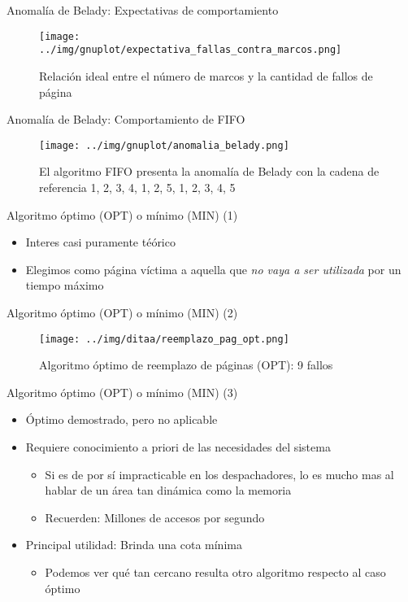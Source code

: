 \documentclass[presentation]{beamer}
\begin{document}
\begin{frame}[label={sec:org3654b76}]{Anomalía de Belady: Expectativas de comportamiento}
\begin{figure}[htbp]
\centering
\texttt{[image: ../img/gnuplot/expectativa\_fallas\_contra\_marcos.png]}
\caption{Relación ideal entre el número de marcos y la cantidad de fallos de página}
\end{figure}
\end{frame}

\begin{frame}[label={sec:orgcaeda9b}]{Anomalía de Belady: Comportamiento de FIFO}
\begin{figure}[htbp]
\centering
\texttt{[image: ../img/gnuplot/anomalia\_belady.png]}
\caption{El algoritmo FIFO presenta la anomalía de Belady con la cadena de referencia 1, 2, 3, 4, 1, 2, 5, 1, 2, 3, 4, 5}
\end{figure}
\end{frame}

\begin{frame}[label={sec:org7b289bb}]{Algoritmo óptimo (OPT) o mínimo (MIN) (1)}
\begin{itemize}
\item Interes casi puramente téórico
\item Elegimos como página víctima a aquella que \emph{no vaya a ser
utilizada} por un tiempo máximo
\end{itemize}
\end{frame}

\begin{frame}[label={sec:org28cb56e}]{Algoritmo óptimo (OPT) o mínimo (MIN) (2)}
\begin{figure}[htbp]
\centering
\texttt{[image: ../img/ditaa/reemplazo\_pag\_opt.png]}
\caption{Algoritmo óptimo de reemplazo de páginas (OPT): 9 fallos}
\end{figure}
\end{frame}

\begin{frame}[label={sec:org8da8484}]{Algoritmo óptimo (OPT) o mínimo (MIN) (3)}
\begin{itemize}
\item Óptimo demostrado, pero no aplicable
\item Requiere conocimiento a priori de las necesidades del sistema
\begin{itemize}
\item Si es de por sí impracticable en los despachadores, lo es mucho
mas al hablar de un área tan dinámica como la memoria
\item Recuerden: Millones de accesos por segundo
\end{itemize}
\item Principal utilidad: Brinda una cota mínima
\begin{itemize}
\item Podemos ver qué tan cercano resulta otro algoritmo respecto al
caso óptimo
\end{itemize}
\end{itemize}
\end{frame}
\end{document}

